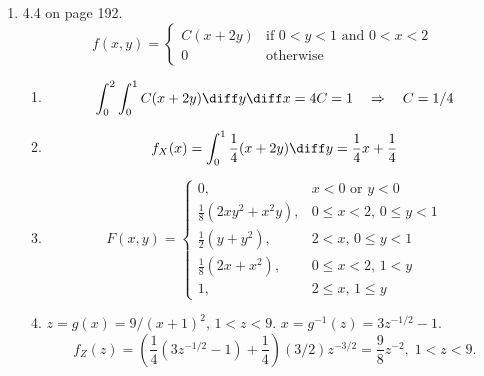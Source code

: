 \documentclass[12pt]{article}
\begin{document}
\begin{enumerate}
\item 4.4 on page 192.
\[
f(x,y) = \begin{cases}
    C(x + 2y) & \text{if $0 < y < 1$ and $0 < x < 2$}\\
    0 & \text{otherwise}
\end{cases}
\]

\begin{enumerate}
\item
\[
\int_0^2 \int_0^1 C(x + 2y) \diff y \diff x
= 4C = 1
\quad\Rightarrow\quad
C = 1/4
\]
\item
\[
f_X(x)
= \int_0^1 \frac{1}{4}(x + 2y) \diff y
= \frac{1}{4}x + \frac{1}{4}
\]
\item
\[
F(x,y)
=
\begin{cases}
 0,  & x<0\text{ or } y<0\\
 \frac{1}{8}(2xy^2 + x^2y),    & 0 \le x < 2,\, 0 \le y < 1\\
 \frac{1}{2}(y+y^2),    & 2 < x,\, 0 \le y < 1\\
 \frac{1}{8}(2x +x^2),    & 0 \le x < 2,\, 1 < y\\
 1,   & 2 \le x,\, 1 \le y
\end{cases}
\]

\item
$z = g(x) = 9/(x + 1)^2$,
$1 < z < 9$.
$x = g^{-1}(z) = 3z^{-1/2} - 1$.
\[
f_Z(z)
= \left(
    \frac{1}{4}(3z^{-1/2} - 1) + \frac{1}{4}
    \right)
    (3/2)z^{-3/2}
= \frac{9}{8}z^{-2}
,\;
1 < z < 9.
\]

\end{enumerate}

\end{enumerate}
\end{document}
